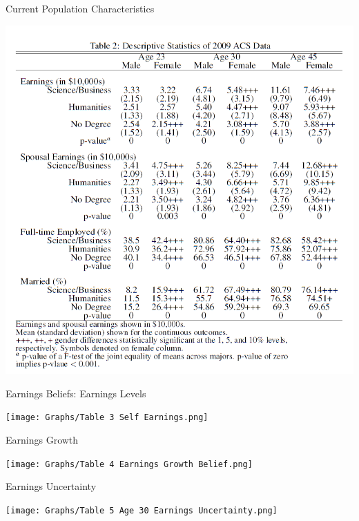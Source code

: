 \documentclass[12pt]{beamer}
\begin{document}
\begin{frame}{Current Population Characteristics}
    \begin{center}
    \includegraphics[scale=0.4]{Table2.png}
    \end{center}
\end{frame}

\begin{frame}{Earnings Beliefs: Earnings Levels}
    \begin{center}
    \texttt{[image: Graphs/Table 3 Self Earnings.png]}
    \end{center}
\end{frame}

\begin{frame}{Earnings Growth}
    \begin{center}
    \texttt{[image: Graphs/Table 4 Earnings Growth Belief.png]}
    \end{center}
\end{frame}

\begin{frame}{Earnings Uncertainty}
    \begin{center}
    \texttt{[image: Graphs/Table 5 Age 30 Earnings Uncertainty.png]}
    \end{center}
\end{frame}
\end{document}

